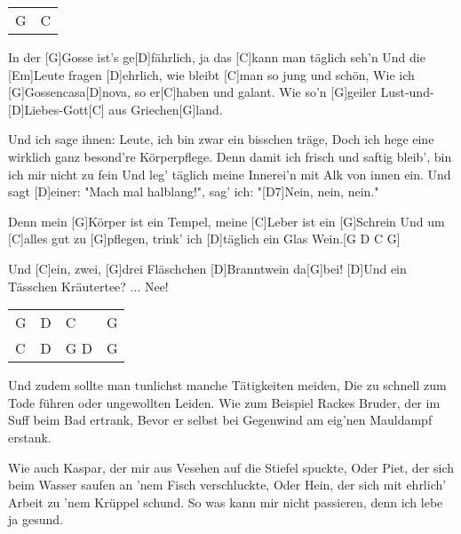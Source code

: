 

\begin{guitar}
	 {\footnotesize\begin{tabular}{|l|l|}
			G & C
	\end{tabular} }
	
	In der [G]Gosse ist's ge[D]fährlich, ja das [C]kann man täglich seh'n
	Und die [Em]Leute fragen [D]ehrlich, wie bleibt [C]man so jung und schön,
	Wie ich [G]Gossencasa[D]nova, so er[C]haben und galant.
	Wie so'n [G]geiler Lust-und-[D]Liebes-Gott[C] aus Griechen[G]land.
	
	Und ich sage ihnen: Leute, ich bin zwar ein bisschen träge,
	Doch ich hege eine wirklich ganz besond're Körperpflege.
	Denn damit ich frisch und saftig bleib', bin ich mir nicht zu fein
	Und leg' täglich meine Innerei'n mit Alk von innen ein.
	Und sagt [D]einer: "Mach mal halblang!", sag' ich: "[D7]Nein, nein, nein."
	
	\begin{highlightbar}
		Denn mein [G]Körper ist ein Tempel, meine [C]Leber ist ein [G]Schrein
		Und um [C]alles gut zu [G]pflegen, trink' ich [D]täglich ein Glas Wein.[G D C G]{}
		
		Und [C]ein, zwei, [G]drei Fläschchen [D]Branntwein da[G]bei!
		[D]Und ein Tässchen Kräutertee? ... Nee!
	\end{highlightbar}
	
	{\footnotesize\begin{tabular}{|l|l|l|l|}
			G & D & C   & G\\
			C & D & G D & G
	\end{tabular}}

	Und zudem sollte man tunlichst manche Tätigkeiten meiden,
	Die zu schnell zum Tode führen oder ungewollten Leiden.
	Wie zum Beispiel Rackes Bruder, der im Suff beim Bad ertrank,
	Bevor er selbst bei Gegenwind am eig'nen Mauldampf erstank.
	
	Wie auch Kaspar, der mir aus Vesehen auf die Stiefel spuckte,
	Oder Piet, der sich beim Wasser saufen an 'nem Fisch verschluckte,
	Oder Hein, der sich mit ehrlich' Arbeit zu 'nem Krüppel schund.
	So was kann mir nicht passieren, denn ich lebe ja gesund.
	

\end{guitar}
